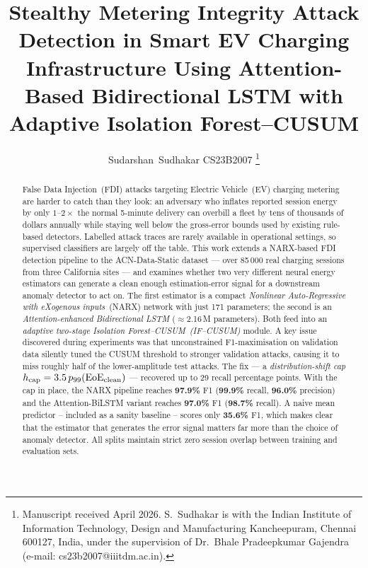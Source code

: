 \documentclass[journal]{IEEEtran}
\begin{document}
\title{Stealthy Metering Integrity Attack Detection in Smart EV        
  Charging Infrastructure Using Attention-Based Bidirectional LSTM 
  with Adaptive Isolation Forest–CUSUM}

\author{Sudarshan~Sudhakar CS23B2007
\thanks{Manuscript received April 2026.
S.~Sudhakar is with the Indian Institute of Information Technology, Design and Manufacturing Kancheepuram,
Chennai 600127, India, under the supervision of Dr.~Bhale Pradeepkumar Gajendra
(e-mail: cs23b2007@iiitdm.ac.in).}}

\maketitle

\begin{abstract}
False Data Injection~(FDI) attacks targeting Electric Vehicle~(EV)
charging metering are harder to catch than they look: an adversary
who inflates reported session energy by only $1$--$2\times$ the
normal 5-minute delivery can overbill a fleet by tens of thousands
of dollars annually while staying well below the gross-error bounds
used by existing rule-based detectors.
Labelled attack traces are rarely available in operational settings,
so supervised classifiers are largely off the table.
This work extends a NARX-based FDI detection pipeline to the
ACN-Data-Static dataset --- over 85\,000 real charging sessions from
three California sites --- and examines whether two very different
neural energy estimators can generate a clean enough estimation-error
signal for a downstream anomaly detector to act on.
The first estimator is a compact \emph{Nonlinear Auto-Regressive
with eXogenous inputs}~(NARX) network with just 171 parameters;
the second is an \emph{Attention-enhanced Bidirectional LSTM}
($\approx$2.16\,M parameters).
Both feed into an \emph{adaptive two-stage Isolation
Forest--CUSUM~(IF--CUSUM)} module.
A key issue discovered during experiments was that unconstrained
F1-maximisation on validation data silently tuned the CUSUM
threshold to stronger validation attacks, causing it to miss
roughly half of the lower-amplitude test attacks.
The fix --- a \emph{distribution-shift cap}
$h_{\rm cap}=3.5\,p_{99}(\text{EoE}_{\rm clean})$ --- recovered
up to 29 recall percentage points.
With the cap in place, the NARX pipeline reaches \textbf{97.9\%}
F1 (\textbf{99.9\%} recall, \textbf{96.0\%} precision)
and the Attention-BiLSTM variant reaches \textbf{97.0\%} F1
(\textbf{98.7\%} recall).
A naive mean predictor -- included as a sanity baseline -- scores
only \textbf{35.6\%} F1, which makes clear that the estimator
that generates the error signal matters far more than the
choice of anomaly detector.
All splits maintain strict zero session overlap between training
and evaluation sets.
\end{abstract}
\end{document}
